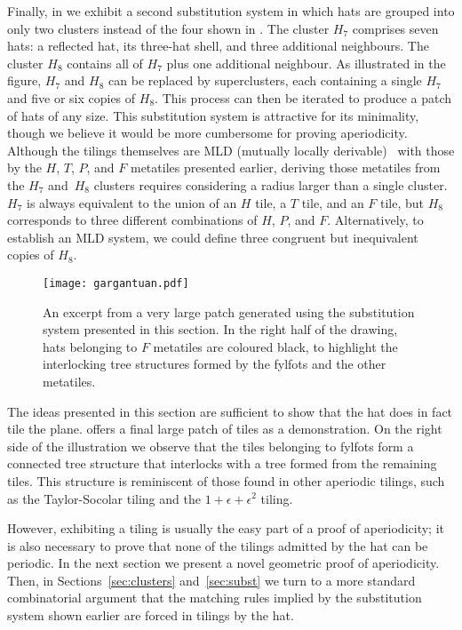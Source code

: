 Finally, in  we  exhibit a second substitution system
in which hats are 
grouped into only two clusters instead of the four shown in 
.  The cluster $H_7$ comprises seven hats:
a reflected hat, its three-hat shell, and three additional neighbours. 
The cluster $H_8$ contains all of $H_7$ plus one additional neighbour.
As illustrated in the figure, $H_7$ and $H_8$ can be replaced by 
superclusters, each containing a single $H_7$ and five or six copies of
$H_8$. This 
process can then be iterated to produce a patch of hats of any size.
This substitution system is attractive for its minimality, though we 
believe it would be more cumbersome for proving aperiodicity.
Although the tilings themselves are MLD (mutually locally
derivable)~\cite{BaakeMLD}
with those by the $H$, $T$, $P$, and $F$ metatiles presented earlier,
deriving those metatiles from the $H_7$ and~$H_8$ clusters requires
considering a radius larger than a single cluster.
$H_7$ is always equivalent to the union of an
$H$ tile, a $T$ tile, and an $F$ tile, but $H_8$  corresponds
to three different combinations of $H$, $P$, and $F$.  Alternatively,
to establish an MLD
system, we could define three congruent but inequivalent copies
of $H_8$.

\begin{figure}[ht!]
\begin{center}
\texttt{[image: gargantuan.pdf]}
\end{center}
\caption{\label{fig:gargantuan}An excerpt from a very large patch generated
	using the substitution system presented in this section.  In the right
	half of the drawing, hats belonging to $F$ metatiles are coloured black,
	to highlight the interlocking tree structures formed by the fylfots
	and the other metatiles.}
\end{figure}

The ideas presented in this section are sufficient to show that the
hat does in fact tile the plane.   offers a
final large patch of tiles as a demonstration.  On the right side
of the illustration we observe that the tiles belonging to fylfots
form a connected tree structure that interlocks with a tree formed
from the remaining tiles.  This structure is reminiscent of those found
in other aperiodic tilings, such as the Taylor-Socolar tiling and 
the $1+\epsilon+\epsilon^2$ tiling.

However, exhibiting a tiling is usually the easy part of 
a proof of aperiodicity; it is also necessary to prove that none of the 
tilings admitted by the hat can be periodic.  In the next section
we present a novel geometric proof of aperiodicity.  Then, in 
Sections~\ref{sec:clusters} and~\ref{sec:subst} we turn to a more standard
combinatorial argument that the matching rules implied by the 
substitution system shown earlier are forced in tilings by the hat.

\FloatBarrier
